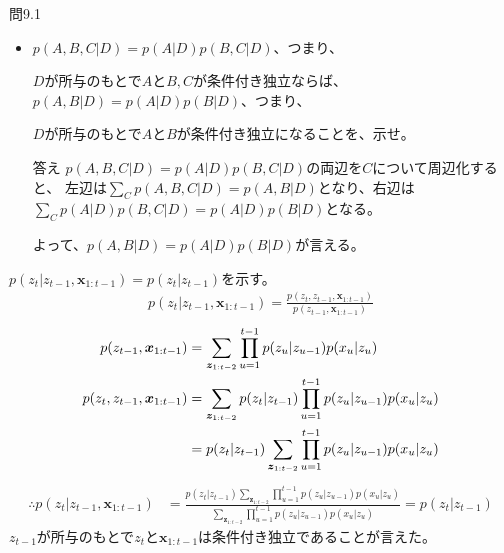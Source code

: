 \documentclass[aspectratio=169,unicode,dvipdfmx,14pt]{beamer}
\begin{document}
\begin{frame}{問9.1}
\begin{itemize}
\item $p(A,B,C|D)=p(A|D)p(B,C|D)$、つまり、
\item[] $D$が所与のもとで$A$と$B,C$が条件付き独立ならば、
$p(A,B|D)=p(A|D)p(B|D)$、つまり、
\item[] $D$が所与のもとで$A$と$B$が条件付き独立になることを、示せ。
\item[答え] $p(A,B,C|D)=p(A|D)p(B,C|D)$の両辺を$C$について周辺化すると、
左辺は$\sum_C p(A,B,C|D)=p(A,B|D)$となり、右辺は$\sum_C  p(A|D)p(B,C|D)=p(A|D)p(B|D)$となる。
\item[] よって、$p(A,B|D) = p(A|D)p(B|D)$が言える。
\end{itemize}
\end{frame}


\begin{frame}{}
\FontMath
$p(z_t|z_{t-1},\bm{x}_{1:t-1}) = p(z_t|z_{t-1})$を示す。
\begin{align}
p(z_t|z_{t-1},\bm{x}_{1:t-1}) = \frac{p(z_t,z_{t-1},\bm{x}_{1:t-1})}{p(z_{t-1},\bm{x}_{1:t-1})}
\end{align}
\begin{align}
p(z_{t-1},\bm{x}_{1:t-1}) & = \sum_{\bm{z}_{1:t-2}} \prod_{u=1}^{t-1} p(z_u|z_{u-1})p(x_u|z_u)
\\
p(z_t,z_{t-1},\bm{x}_{1:t-1}) & = \sum_{\bm{z}_{1:t-2}} p(z_t|z_{t-1}) \prod_{u=1}^{t-1} p(z_u|z_{u-1})p(x_u|z_u)
\notag \\ &
= p(z_t|z_{t-1}) \sum_{\bm{z}_{1:t-2}} \prod_{u=1}^{t-1} p(z_u|z_{u-1})p(x_u|z_u)
\label{eq:eq01}
\end{align}
\begin{align}
\therefore
p(z_t|z_{t-1},\bm{x}_{1:t-1}) & = \frac{p(z_t|z_{t-1})  \sum_{\bm{z}_{1:t-2}} \prod_{u=1}^{t-1} p(z_u|z_{u-1})p(x_u|z_u)
}{\sum_{\bm{z}_{1:t-2}} \prod_{u=1}^{t-1} p(z_u|z_{u-1})p(x_u|z_u)
}
 = p(z_t|z_{t-1}) 
\end{align}
$z_{t-1}$が所与のもとで$z_t$と$\bm{x}_{1:t-1}$は条件付き独立であることが言えた。
\end{frame}
\end{document}
